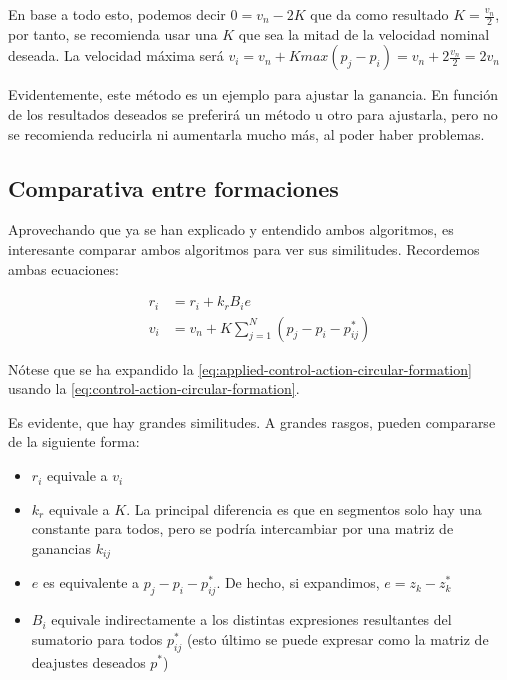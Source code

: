En base a todo esto, podemos decir $0 = v_n - 2K$ que da 
como resultado $K = \frac{v_n}{2}$, por tanto, 
se recomienda usar una $K$ que sea la mitad de la velocidad nominal deseada.
La velocidad máxima será $v_i = v_n + Kmax(p_j - p_i) = v_n + 2 \frac{v_n}{2} = 2v_n$

Evidentemente, este método es un ejemplo para ajustar la ganancia. 
En función de los resultados deseados se preferirá un método u otro para ajustarla,
pero no se recomienda reducirla ni aumentarla mucho más, al poder haber problemas. 


\subsection{Comparativa entre formaciones}

Aprovechando que ya se han explicado y entendido ambos algoritmos, es interesante
comparar ambos algoritmos para ver sus similitudes. Recordemos ambas ecuaciones:

\begin{align*}
    r_i &= r_i + k_r B_i e \\
    v_i &= v_n + K \sum_{j=1}^{N} (p_j - p_i - p^{*}_{ij})
\end{align*}

Nótese que se ha expandido la \autoref{eq:applied-control-action-circular-formation} usando
la \autoref{eq:control-action-circular-formation}.

Es evidente, que hay grandes similitudes. A grandes rasgos, pueden compararse de la siguiente forma:

\begin{itemize}
    \item $r_i$ equivale a $v_i$
    \item $k_r$ equivale a $K$. 
    La principal diferencia es que en segmentos solo hay una constante para todos,
    pero se podría intercambiar por una matriz de ganancias $k_{ij}$
    \item $e$ es equivalente a $p_j - p_i - p^{*}_{ij}$. De hecho, si expandimos,
    $e = z_k - z_k^*$
    \item $B_i$ equivale indirectamente a los distintas expresiones resultantes del sumatorio 
    para todos $p^{*}_{ij}$ (esto último se puede expresar como la matriz de deajustes deseados $p^*$)
\end{itemize}

